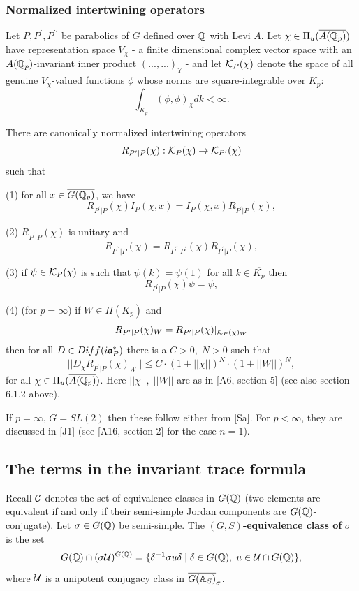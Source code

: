 \subsubsection{Normalized intertwining operators}

Let $P,P^{\prime },P^{\prime \prime }$ be parabolics of
$G$ defined over ${\Bbb{Q}}$
with Levi $A$. Let $\chi \in \Pi _u({\overline{A({\Bbb{Q}}_p)}})$ have
representation space $V_\chi $ - a finite dimensional complex vector space
with an ${A({\Bbb {Q}}_p)}$-invariant inner product
$(...,...)_\chi $ - and let ${\cal{K}}_P(\chi )$ denote the space of all
genuine $V_\chi $-valued functions $\phi $
whose norms are square-integrable over
${K_p}$: 
\[
\int_{K_p}(\phi ,\phi )_\chi dk<\infty . 
\]

\begin{conjecture}
There are canonically normalized intertwining operators 
\[
R_{P^{\prime }|P}(\chi ):{\cal{K}}_P(\chi )\rightarrow
{\cal{K}}_{P^{\prime}}(\chi ) 
\]
such that

(1) for all $x\in \overline{G({\Bbb{Q}}_p)}$, we have 
\[
R_{P^{\prime }|P}(\chi )I_P(\chi ,x)
=I_P(\chi ,x)R_{P^{\prime }|P}(\chi ), 
\]

(2) $R_{P^{\prime }|P}(\chi )$ is unitary and 
\[
R_{P^{\prime \prime }|P}(\chi )
=R_{P^{\prime \prime }|P^{\prime }}(\chi)R_{P^{\prime }|P}(\chi ), 
\]

(3) if $\psi \in {\cal K}_P(\chi )$ is such that
$\psi (k)=\psi (1)$
for all $k\in \overline{K_p}$ then 
\[
R_{P^{\prime }|P}(\chi )\psi =\psi , 
\]

(4) (for $p=\infty $) if $W\in \Pi (\overline{K_p})$ and 
\[
R_{P^{\prime }|P}(\chi )_W=R_{P^{\prime }|P}(\chi )|_{{\cal{K}}_P(\chi )_W}
\]
then for all $D\in Diff(i{\frak {a}}_P^{*})$ there is a $C>0,\;N>0$ such
that 
\[
||D_\chi R_{P^{\prime }|P}(\chi )_W||\leq C\cdot (1+||\chi ||)^N\cdot
(1+||W||)^N,
\]
for all $\chi \in \Pi _u(\overline{A({\Bbb{Q}}_p)})$.
Here $||\chi||,\;||W||$ are as in [A6, section 5]
(see also section 6.1.2 above).
\end{conjecture}

If $p=\infty $, $G=SL(2)$ then these follow either from [Sa].
For $p<\infty$, they are discussed in [J1] (see [A16, section 2]
for the case $n=1$).

\subsection{The terms in the invariant trace formula}

Recall ${\cal C}$ denotes the set of equivalence classes in $G({\Bbb {Q}})$
(two elements are equivalent if and only if their semi-simple
Jordan components are $G({\Bbb{Q}})$-conjugate). Let
$\sigma \in G({\Bbb{Q}})$ be semi-simple. The
$(G,S)${\bf -equivalence class of }$\sigma $ is
the set 
\[
G({\Bbb{Q}})\cap (\sigma {\cal{U}})^{G({\Bbb{Q}})}
=\{\delta ^{-1}\sigma u\delta
\;|\;\delta \in G({\Bbb{Q}}),\;u\in {\cal{U}}\cap G({\Bbb{Q}})\}, 
\]
where ${\cal{U}}$ is a unipotent conjugacy class in
$\overline{G({\Bbb {A}}_S)}_\sigma$.

